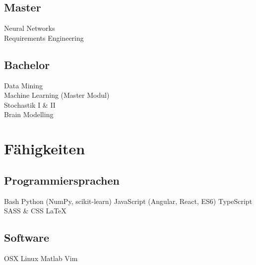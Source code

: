 \documentclass[]{deedy-resume-openfont}
\begin{document}
\begin{minipage}[t]{0.33\textwidth}
\subsection{Master}
Neural Networks \\
Requirements Engineering \\
\sectionsep

\subsection{Bachelor}
Data Mining \\
Machine Learning (Master Modul) \\
Stochastik I \& II \\
Brain Modelling


\section{Fähigkeiten}
\subsection{Programmiersprachen}
Bash \textbullet{} Python (NumPy, scikit-learn) \textbullet{} JavaScript (Angular, React, ES6) \textbullet{} TypeScript \textbullet{} SASS \& CSS \textbullet{} \LaTeX \textbullet{}
\sectionsep

\subsection{Software}
OSX \textbullet{} Linux \textbullet{} Matlab \textbullet{}
Vim

%
%

\end{minipage}
\hfill
\end{document}
